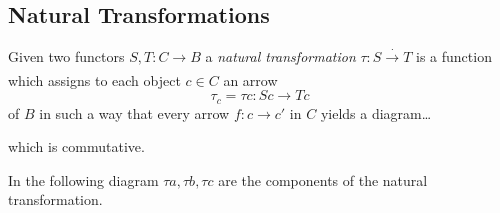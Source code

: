 \subsection{Natural Transformations}\label{naturaltransformations}

Given two functors $S,T: C \rightarrow B$ a \emph{natural transformation} $\tau : S \xrightarrow[]{\cdot} T$ is a function which assigns to each object $c \in C$ an arrow
$$\tau_c = \tau c: Sc \rightarrow Tc$$
of $B$ in such a way that every arrow $f: c \rightarrow c'$ in $C$ yields a diagram\dots\newline



\noindent which is commutative. \newline

\noindent In the following diagram $\tau a, \tau b, \tau c$ are the components of the natural transformation.

